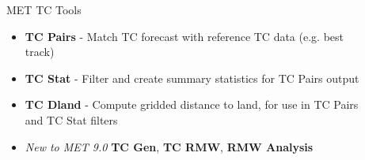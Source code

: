 \documentclass[final]{beamer}
\newlength{\sepwid}
\newlength{\onecolwid}
\newlength{\twocolwid}
\begin{document}
\begin{frame}[t]
\begin{columns}[t]
\begin{column}{\onecolwid}
\end{column} %

\begin{column}{\sepwid}\end{column} %

\begin{column}{\twocolwid} %

\begin{columns}[t,totalwidth=\twocolwid] %

\begin{column}{\onecolwid}\vspace{-.6in} %


\end{column} %

\begin{column}{\onecolwid}\vspace{-.6in} %


\end{column} %

\end{columns} %


\begin{alertblock}{MET TC Tools}
\begin{itemize}
\item {\bf TC Pairs} - Match TC forecast with reference TC data
(e.g. best track)
\item {\bf TC Stat} - Filter and create summary statistics
for TC Pairs output
\item {\bf TC Dland} - Compute gridded distance to land,
for use in TC Pairs and TC Stat filters
\item {\it New to MET 9.0}
{\bf TC Gen}, {\bf TC RMW}, {\bf RMW Analysis}
\end{itemize}
\end{alertblock}


\end{column}
\end{columns}
\end{frame}
\end{document}

